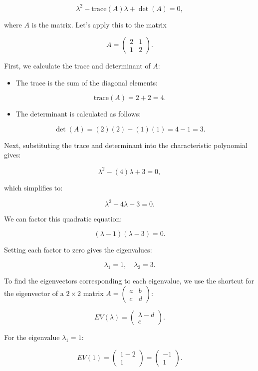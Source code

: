 \documentclass[
  letterpaper,
  DIV=11,
  numbers=noendperiod]{scrreprt}
\providecommand{\tightlist}{%
  \setlength{\itemsep}{0pt}\setlength{\parskip}{0pt}}\usepackage{longtable,booktabs,array}
\theoremstyle{plain}
\theoremstyle{definition}
\theoremstyle{remark}
\begin{document}
\[
\lambda^2 - \text{trace}(A)\lambda + \det(A) = 0,
\]

where \(A\) is the matrix. Let's apply this to the matrix

\[
A = \begin{pmatrix} 2 & 1 \\ 1 & 2 \end{pmatrix}.
\]

First, we calculate the trace and determinant of \(A\):

\begin{itemize}
\tightlist
\item
  The trace is the sum of the diagonal elements:
\end{itemize}

\[
\text{trace}(A) = 2 + 2 = 4.
\]

\begin{itemize}
\tightlist
\item
  The determinant is calculated as follows:
\end{itemize}

\[
\det(A) = (2)(2) - (1)(1) = 4 - 1 = 3.
\]

Next, substituting the trace and determinant into the characteristic
polynomial gives:

\[
\lambda^2 - (4)\lambda + 3 = 0,
\]

which simplifies to:

\[
\lambda^2 - 4\lambda + 3 = 0.
\]

We can factor this quadratic equation:

\[
(\lambda - 1)(\lambda - 3) = 0.
\]

Setting each factor to zero gives the eigenvalues:

\[
\lambda_1 = 1, \quad \lambda_2 = 3.
\]

To find the eigenvectors corresponding to each eigenvalue, we use the
shortcut for the eigenvector of a \(2 \times 2\) matrix
\(A = \begin{pmatrix} a & b \\ c & d \end{pmatrix}\):

\[
EV(\lambda) = \begin{pmatrix} \lambda - d \\ c \end{pmatrix}.
\]

For the eigenvalue \(\lambda_1 = 1\):

\[
EV(1) = \begin{pmatrix} 1 - 2 \\ 1 \end{pmatrix} = \begin{pmatrix} -1 \\ 1 \end{pmatrix}.
\]
\end{document}
